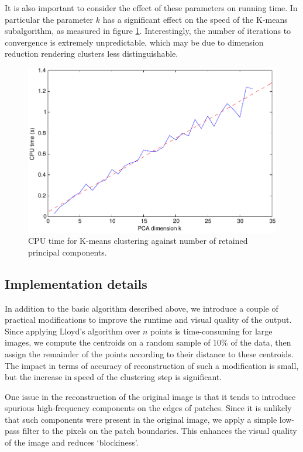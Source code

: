 It is also important to consider the effect of these parameters on running time. In particular the parameter $k$ has a significant effect on the speed of the K-means subalgorithm, as measured in figure \ref{cpu_k}. Interestingly, the number of iterations to convergence is extremely unpredictable, which may be due to dimension reduction rendering clusters less distinguishable.

\begin{figure}[tbp]
    \includegraphics[width=\columnwidth]{cpu_pca-crop}
    \caption{CPU time for K-means clustering against number of retained principal components.}
    \label{cpu_k}
\end{figure}

\subsection{Implementation details}
In addition to the basic algorithm described above, we introduce a couple of practical modifications to improve the runtime and visual quality of the output. Since applying Lloyd's algorithm over $n$ points is time-consuming for large images, we compute the centroids on a random sample of $10\%$ of the data, then assign the remainder of the points according to their distance to these centroids. The impact in terms of accuracy of reconstruction of such a modification is small, but the increase in speed of the clustering step is significant.

One issue in the reconstruction of the original image is that it tends to introduce spurious high-frequency components on the edges of patches. Since it is unlikely that such components were present in the original image, we apply a simple low-pass filter to the pixels on the patch boundaries. This enhances the visual quality of the image and reduces `blockiness'.